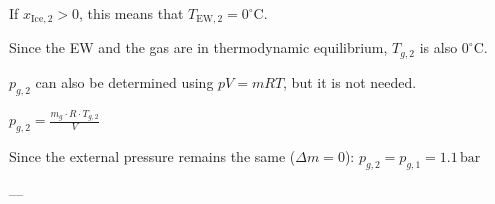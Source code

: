If \( x_{\text{Ice},2} > 0 \), this means that \( T_{\text{EW},2} = 0^\circ \text{C} \).  

Since the EW and the gas are in thermodynamic equilibrium, \( T_{g,2} \) is also \( 0^\circ \text{C} \).  

\( p_{g,2} \) can also be determined using \( pV = mRT \), but it is not needed.

\( p_{g,2} = \frac{m_{g} \cdot R \cdot T_{g,2}}{V} \)  

Since the external pressure remains the same (\( \Delta m = 0 \)):  
\( p_{g,2} = p_{g,1} = 1.1 \, \text{bar} \)  

---